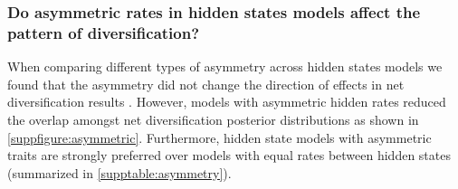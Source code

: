 \subsubsection{Do asymmetric rates in hidden states models affect the pattern of diversification?}
When comparing different types of asymmetry across hidden states models we found that the asymmetry did not change the direction of effects in net diversification results . However, models with asymmetric hidden rates reduced the overlap amongst net diversification posterior distributions as shown in \cref{suppfigure:asymmetric}. Furthermore, hidden state models with asymmetric traits are strongly preferred over models with equal rates between hidden states (summarized in \cref{supptable:asymmetry}).

